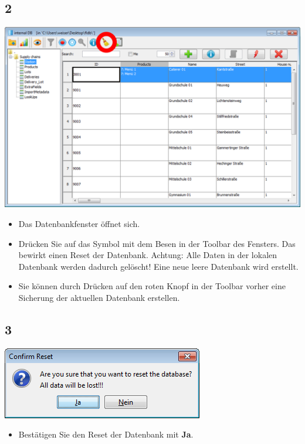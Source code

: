 \documentclass{beamer}
\begin{document}
\subsection{2}
\begin{frame}
	\begin{center}
  		\includegraphics[height=0.6\textheight]{2.png}
	\end{center}
	\begin{itemize}
		\item Das Datenbankfenster öffnet sich.
		\item Drücken Sie auf das Symbol mit dem Besen in der Toolbar des Fensters. Das bewirkt einen Reset der Datenbank. Achtung: Alle Daten in der lokalen Datenbank werden dadurch gelöscht! Eine neue leere Datenbank wird erstellt.
		\item Sie können durch Drücken auf den roten Knopf in der Toolbar vorher eine Sicherung der aktuellen Datenbank erstellen.
	\end{itemize}
\end{frame}

\subsection{3}
\begin{frame}
	\begin{center}
  		\includegraphics[height=0.3\textheight]{3.png}
	\end{center}
	\begin{itemize}
		\item Bestätigen Sie den Reset der Datenbank mit \textbf{Ja}.
	\end{itemize}
\end{frame}
\end{document}
